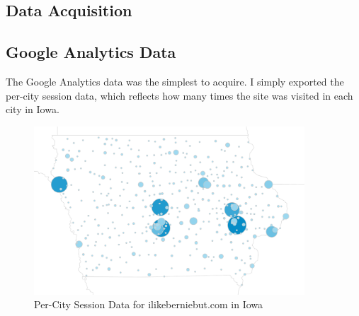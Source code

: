 \documentclass[11pt]{article}
\begin{document}
\begin{multicols}{2}
\section{Data Acquisition}

\subsection{Google Analytics Data}

The Google Analytics data was the simplest to acquire. I simply exported the per-city session data, which reflects how many times the site was visited in each city in Iowa.

\end{multicols}

\begin{figure}[H]
    \caption{Per-City Session Data for ilikeberniebut.com in Iowa}
    \centering
    \includegraphics[width=0.9\textwidth]{google-analytics}
\end{figure}
 
\end{document}
